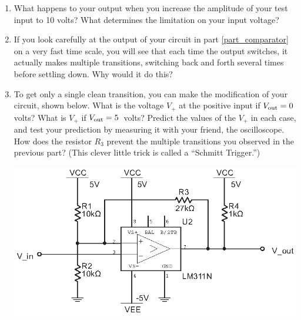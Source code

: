 \begin{enumerate}[wide]
\item What happens to your output when you increase the amplitude of your test input to 10 volts?  What determines the limitation on your input voltage?

\item If you look carefully at the output of your circuit in part \ref{part_comparator} on a very fast time scale, you will see that each time the output switches, it actually makes multiple transitions, switching back and forth several times before settling down.  Why would it do this?  

\item To get only a single clean transition, you can make the modification of your circuit, shown below.  What is the voltage $V_+$ at the positive input if $V_{\rm out}=0$ volts?  What is $V_+$ if $V_{\rm out}=5$~volts?   Predict the values of the $V_+$ in each case, and test your prediction by measuring it with your friend, the oscilloscope.  How does the resistor $R_3$ prevent the multiple transitions you observed in the previous part?  (This clever little trick is called a ``Schmitt Trigger.'') \label{part_schmitt_trigger}

\begin{center}
\includegraphics{digital_electronics/schmitt_trigger.eps}
\end{center}


\end{enumerate}


